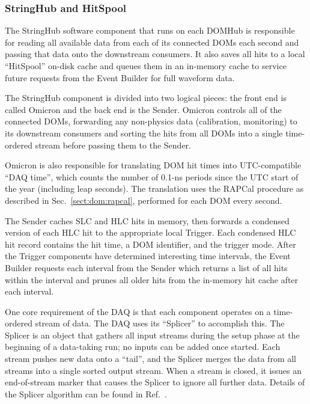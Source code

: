 \subsubsection{StringHub and HitSpool}
\label{sec:domhub_hitspool}

The StringHub software component that runs on each DOMHub is responsible
for reading all available data from each of its connected DOMs each second
and passing that data onto the downstream consumers.  It also saves all
hits to a local ``HitSpool'' on-disk cache and queues them in an
in-memory cache to service future requests from the Event Builder for full
waveform data.

The StringHub component is divided into two logical pieces: the front
end is called Omicron and the back end is the Sender. Omicron controls all
of the connected DOMs, forwarding any 
non-physics data (calibration, monitoring) to its downstream consumers and
sorting the hits from all 
DOMs into a single time-ordered stream before passing them to the Sender.  

Omicron is also responsible for translating DOM hit times into
UTC-compatible ``DAQ time'', which counts the number of 0.1-ns periods
since the UTC start of the year (including leap seconds).  The translation
uses the RAPCal procedure as described in Sec.~\ref{sect:dom:rapcal},
performed for each DOM every second.  

The Sender caches SLC and HLC hits in memory, then forwards a
condensed version of each HLC hit to the appropriate local Trigger. Each
condensed HLC hit record contains the hit time, a DOM identifier, and the
trigger mode.  After the
Trigger components have determined interesting time intervals, 
the Event Builder requests each interval from the Sender which returns a list of
all hits within the interval and prunes all older hits from the in-memory hit
cache after each interval.

One core requirement of the DAQ is that each component operates on a
time-ordered stream of data.  The DAQ uses its ``Splicer'' to accomplish
this.  The Splicer is an object that gathers all input streams
during the setup phase at the beginning of a data-taking run; no inputs can
be added once started.  Each stream 
pushes new data onto a ``tail'', and the Splicer merges the data from all
streams into a single sorted output stream.  When a stream is closed, it
issues an end-of-stream marker that causes the Splicer to
ignore all further data.  Details of the Splicer algorithm can be found in
Ref.~\cite{vlvnt13_trigger}.  

